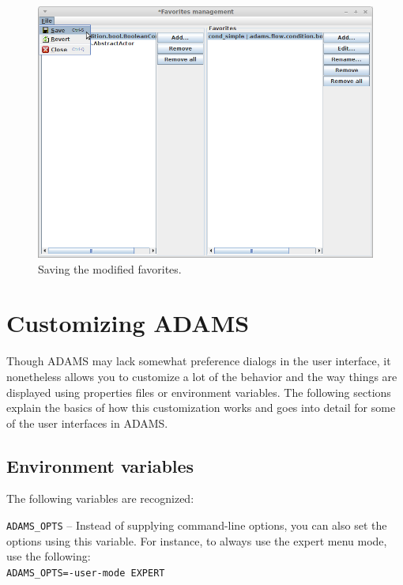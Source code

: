 \begin{figure}[htb]
  \centering
  \includegraphics[width=12.0cm]{images/favoritesmanagement-save.png}
  \caption{Saving the modified favorites.}
  \label{favoritesmanagement-save}
\end{figure}


\chapter{Customizing ADAMS}
Though ADAMS may lack somewhat preference dialogs in the user interface, it 
nonetheless allows you to customize a lot of the behavior and the way things
are displayed using properties files or environment variables. The following 
sections explain the basics of how this customization works and goes into 
detail for some of the user interfaces in ADAMS.

\section{Environment variables}
The following variables are recognized:
\begin{tight_itemize}
	\item \texttt{ADAMS\_OPTS} -- Instead of supplying command-line options, 
	you can also set the options using this variable. For instance, to always
	use the expert menu mode, use the following:\\
	\texttt{ADAMS\_OPTS=-user-mode EXPERT}
\end{tight_itemize}

